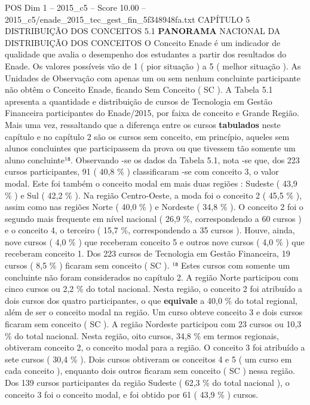 \begin{textsample}{POS Dim 1 – 2015\_c5 – Score 10.00 – 2015\_c5/enade\_2015\_tec\_gest\_fin\_5f348948fa.txt}  \label{ex:f1_pos_093}
CAPÍTULO 5 DISTRIBUIÇÃO DOS CONCEITOS 5.1 \textbf{PANORAMA} NACIONAL DA DISTRIBUIÇÃO DOS CONCEITOS O Conceito Enade é um indicador de qualidade que avalia o desempenho dos estudantes a partir dos resultados do Enade.
Os valores possíveis vão de 1 ( pior situação ) a 5 ( melhor situação ).
As Unidades de Observação com apenas um ou sem nenhum concluinte participante não obtêm o Conceito Enade, ficando Sem Conceito ( SC ).
A Tabela 5.1 apresenta a quantidade e distribuição de cursos de Tecnologia em Gestão Financeira participantes do Enade/2015, por faixa de conceito e Grande Região.
Mais uma vez, ressaltando que a diferença entre os cursos \textbf{tabulados} neste capítulo e no capítulo 2 são os cursos sem conceito, em princípio, aqueles sem alunos concluintes que participassem da prova ou que tivessem tão somente um aluno concluinte¹⁸.
Observando -se os dados da Tabela 5.1, nota -se que, dos 223 cursos participantes, 91 ( 40,8 \% ) classificaram -se com conceito 3, o valor modal.
Este foi também o conceito modal em mais duas regiões : Sudeste ( 43,9 \% ) e Sul ( 42,2 \% ).
Na região Centro-Oeste, a moda foi o conceito 2 ( 45,5 \% ), assim como nas regiões Norte ( 40,0 \% ) e Nordeste ( 34,8 \% ).
O conceito 2 foi o segundo mais frequente em nível nacional ( 26,9 \%, correspondendo a 60 cursos ) e o conceito 4, o terceiro ( 15,7 \%, correspondendo a 35 cursos ).
Houve, ainda, nove cursos ( 4,0 \% ) que receberam conceito 5 e outros nove cursos ( 4,0 \% ) que receberam conceito 1.
Dos 223 cursos de Tecnologia em Gestão Financeira, 19 cursos ( 8,5 \% ) ficaram sem conceito ( SC ). ¹⁸ Estes cursos com somente um concluinte não foram considerados no capítulo 2.
A região Norte participou com cinco cursos ou 2,2 \% do total nacional.
Nesta região, o conceito 2 foi atribuído a dois cursos dos quatro participantes, o que \textbf{equivale} a 40,0 \% do total regional, além de ser o conceito modal na região.
Um curso obteve conceito 3 e dois cursos ficaram sem conceito ( SC ).
A região Nordeste participou com 23 cursos ou 10,3 \% do total nacional.
Nesta região, oito cursos, 34,8 \% em termos regionais, obtiveram conceito 2, o conceito modal para a região.
O conceito 3 foi atribuído a sete cursos ( 30,4 \% ).
Dois cursos obtiveram os conceitos 4 e 5 ( um curso em cada conceito ), enquanto dois outros ficaram sem conceito ( SC ) nessa região.
Dos 139 cursos participantes da região Sudeste ( 62,3 \% do total nacional ), o conceito 3 foi o conceito modal, e foi obtido por 61 ( 43,9 \% ) cursos.

\end{textsample}
